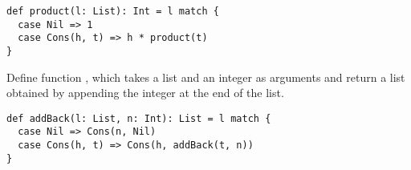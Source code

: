 \begin{verbatim}
def product(l: List): Int = l match {
  case Nil => 1
  case Cons(h, t) => h * product(t)
}
\end{verbatim}

Define function , which takes a list and an integer as arguments
and return a list obtained by appending the integer at the end of the list.

\begin{verbatim}
def addBack(l: List, n: Int): List = l match {
  case Nil => Cons(n, Nil)
  case Cons(h, t) => Cons(h, addBack(t, n))
}
\end{verbatim}

